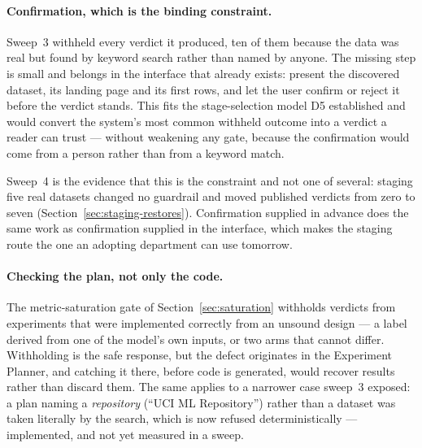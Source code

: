 \paragraph{Confirmation, which is the binding constraint.} Sweep~3 withheld
every verdict it produced, ten of them because the data was real but found by
keyword search rather than named by anyone. The missing step is small and belongs
in the interface that already exists: present the discovered dataset, its landing
page and its first rows, and let the user confirm or reject it before the verdict
stands. This fits the stage-selection model D5 established and would convert the
system's most common withheld outcome into a verdict a reader can trust ---
without weakening any gate, because the confirmation would come from a person
rather than from a keyword match.

Sweep~4 is the evidence that this is the constraint and not one of several:
staging five real datasets changed no guardrail and moved published verdicts from
zero to seven (Section~\ref{sec:staging-restores}). Confirmation supplied in
advance does the same work as confirmation supplied in the interface, which makes
the staging route the one an adopting department can use tomorrow.

\paragraph{Checking the plan, not only the code.} The metric-saturation gate of
Section~\ref{sec:saturation} withholds verdicts from experiments that were
implemented correctly from an unsound design --- a label derived from one of the
model's own inputs, or two arms that cannot differ. Withholding is the safe
response, but the defect originates in the Experiment Planner, and catching it
there, before code is generated, would recover results rather than discard them.
The same applies to a narrower case sweep~3 exposed: a plan naming a
\emph{repository} (``UCI ML Repository'') rather than a dataset was taken
literally by the search, which is now refused deterministically --- implemented,
and not yet measured in a sweep.

